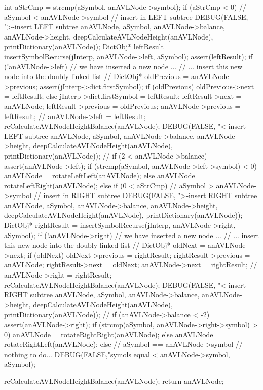 {  int aStrCmp = strcmp(aSymbol, anAVLNode->symbol);
  if (aStrCmp < 0) {
    // aSymbol < anAVLNode->symbol // insert in LEFT subtree
    DEBUG(FALSE, ">-insert LEFT subtree %
          anAVLNode, aSymbol, anAVLNode->balance,
          anAVLNode->height, deepCalculateAVLNodeHeight(anAVLNode),
          printDictionary(anAVLNode));
    DictObj* leftResult =
      insertSymbolRecurse(jInterp, anAVLNode->left, aSymbol);
    assert(leftResult);
    if (!anAVLNode->left) {
      // we have inserted a new node ...
      // ... insert this new node into the doubly linked list
      //
      DictObj* oldPrevious               = anAVLNode->previous;
      assert(jInterp->dict.firstSymbol);
      if (oldPrevious) oldPrevious->next = leftResult;
      else jInterp->dict.firstSymbol     = leftResult;
      leftResult->next                   = anAVLNode;
      leftResult->previous               = oldPrevious;
      anAVLNode->previous                = leftResult;
      //
    }
    anAVLNode->left = leftResult;
    reCalculateAVLNodeHeightBalance(anAVLNode);
    DEBUG(FALSE, "<-insert LEFT subtree %
          anAVLNode, aSymbol, anAVLNode->balance,
          anAVLNode->height, deepCalculateAVLNodeHeight(anAVLNode),
          printDictionary(anAVLNode));
    //
    if (2 < anAVLNode->balance) {
      assert(anAVLNode->left);
      if (strcmp(aSymbol, anAVLNode->left->symbol) < 0) {
        anAVLNode = rotateLeftLeft(anAVLNode);
      } else {
        anAVLNode = rotateLeftRight(anAVLNode);
      }
    }
  } else if (0 < aStrCmp) {
    // aSymbol > anAVLNode->symbol // insert in RIGHT subtree
    DEBUG(FALSE, ">-insert RIGHT subtree %
        anAVLNode, aSymbol, anAVLNode->balance,
        anAVLNode->height, deepCalculateAVLNodeHeight(anAVLNode),
        printDictionary(anAVLNode));
    DictObj* rightResult =
      insertSymbolRecurse(jInterp, anAVLNode->right, aSymbol);
    if (!anAVLNode->right) {
      // we have inserted a new node ...
      // ... insert this new node into the doubly linked list
      //
      DictObj* oldNext               = anAVLNode->next;
      if (oldNext) oldNext->previous = rightResult;
      rightResult->previous          = anAVLNode;
      rightResult->next              = oldNext;
      anAVLNode->next                = rightResult;
      //
    }
    anAVLNode->right = rightResult;
    reCalculateAVLNodeHeightBalance(anAVLNode);
    DEBUG(FALSE, "<-insert RIGHT subtree %
        anAVLNode, aSymbol, anAVLNode->balance,
        anAVLNode->height, deepCalculateAVLNodeHeight(anAVLNode),
        printDictionary(anAVLNode));
    //
    if (anAVLNode->balance < -2) {
      assert(anAVLNode->right);
      if (strcmp(aSymbol, anAVLNode->right->symbol) > 0) {
        anAVLNode = rotateRightRight(anAVLNode);
      } else {
        anAVLNode = rotateRightLeft(anAVLNode);
      }
    }
  } else {
    // aSymbol == anAVLNode->symbol // nothing to do...
    DEBUG(FALSE,"symols equal <%
          anAVLNode->symbol, aSymbol);
  }

  reCalculateAVLNodeHeightBalance(anAVLNode);
  return anAVLNode;
}
\stopCCode

